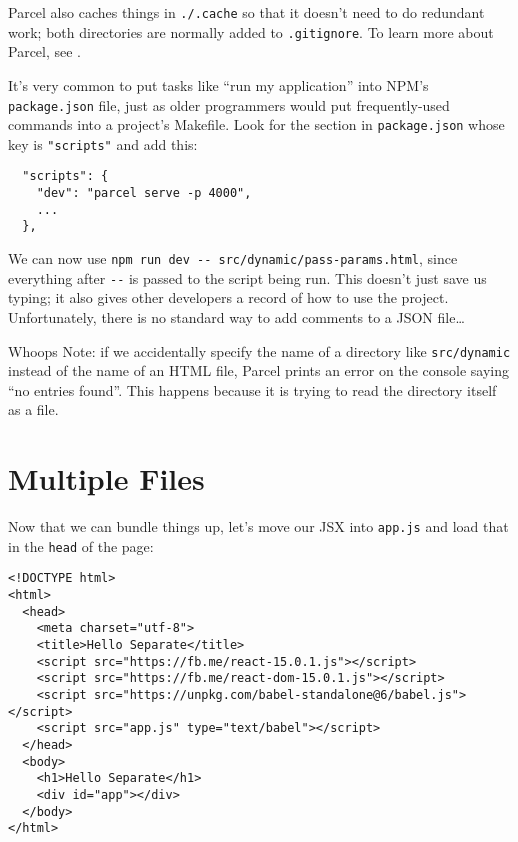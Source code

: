 Parcel also caches things in \texttt{./.cache} so that it doesn't need to do redundant work;
both directories are normally added to \texttt{.gitignore}.
To learn more about Parcel,
see .


It's very common to put tasks like ``run my application''
into NPM's \texttt{package.json} file,
just as older programmers would put frequently-used commands into a project's Makefile.
Look for the section in \texttt{package.json} whose key is \texttt{"scripts"} and add this:

\begin{verbatim}
  "scripts": {
    "dev": "parcel serve -p 4000",
    ...
  },
\end{verbatim}

We can now use \texttt{npm\ run\ dev\ -\/-\ src/dynamic/pass-params.html},
since everything after \texttt{-\/-} is passed to the script being run.
This doesn't just save us typing;
it also gives other developers a record of how to use the project.
Unfortunately,
there is no standard way to add comments to a JSON file{\ldots}

\begin{aside}{Whoops}
  Note:
  if we accidentally specify the name of a directory like \texttt{src/dynamic}
  instead of the name of an HTML file,
  Parcel prints an error on the console saying ``no entries found''.
  This happens because it is trying to read the directory itself as a file.
\end{aside}

\section{Multiple Files}\label{s:dynamic-multiple}

Now that we can bundle things up,
let's move our JSX into \texttt{app.js} and load that in the \texttt{head} of the page:

\begin{verbatim}
<!DOCTYPE html>
<html>
  <head>
    <meta charset="utf-8">
    <title>Hello Separate</title>
    <script src="https://fb.me/react-15.0.1.js"></script>
    <script src="https://fb.me/react-dom-15.0.1.js"></script>
    <script src="https://unpkg.com/babel-standalone@6/babel.js"></script>
    <script src="app.js" type="text/babel"></script>
  </head>
  <body>
    <h1>Hello Separate</h1>
    <div id="app"></div>
  </body>
</html>
\end{verbatim}

